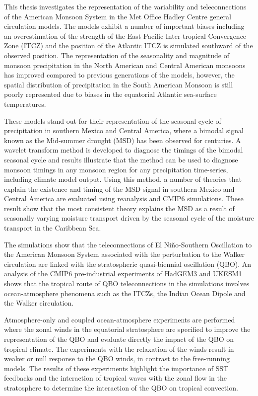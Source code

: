 This thesis investigates the representation of the variability and teleconnections of the American Monsoon System in the Met Office Hadley Centre general circulation models. 
The models exhibit a number of important biases including an overestimation of the strength of the East Pacific Inter-tropical Convergence Zone (ITCZ) and the position of the Atlantic ITCZ is simulated southward of the observed position. 
The representation of the seasonality and magnitude of monsoon precipitation in the North American and Central American monsoons has improved compared to previous generations of the models, however, the spatial distribution of precipitation in the South American Monsoon is still poorly represented due to biases in the equatorial Atlantic sea-surface temperatures.

These models stand-out for their representation of the seasonal cycle of precipitation in southern Mexico and Central America, where a bimodal signal known as the Mid-summer drought (MSD) has been observed for centuries. 
A wavelet transform method is developed to diagnose the timings of the bimodal seasonal cycle and results illustrate that the method can be used to diagnose monsoon timings in any monsoon region for any precipitation time-series, including climate model output.
Using this method, a number of theories that explain the existence and timing of the MSD signal in southern Mexico and Central America are evaluated using reanalysis and CMIP6 simulations.
These result show that the most consistent theory explains the MSD as a result of seasonally varying moisture transport driven by the seasonal cycle of the moisture transport in the Caribbean Sea. 

The simulations show that the teleconnections of El Niño-Southern Oscillation to the American Monsoon System associated with the perturbation to the Walker circulation are linked with the stratospheric quasi-biennial oscillation (QBO). 
An analysis of the CMIP6 pre-industrial experiments of HadGEM3 and UKESM1 shows that the tropical route of QBO teleconnections in the simulations involves ocean-atmosphere phenomena such as the ITCZs, the Indian Ocean Dipole and the Walker circulation. 

Atmosphere-only and coupled ocean-atmosphere experiments are performed where the zonal winds in the equatorial stratosphere are specified to improve the representation of the QBO and evaluate directly the impact of the QBO on tropical climate. 
The experiments with the relaxation of the winds result in weaker or null response to the QBO winds, in contrast to the free-running models. 
The results of these experiments highlight the importance of SST feedbacks and the interaction of tropical waves with the zonal flow in the stratosphere to determine the interaction of the QBO on tropical convection.